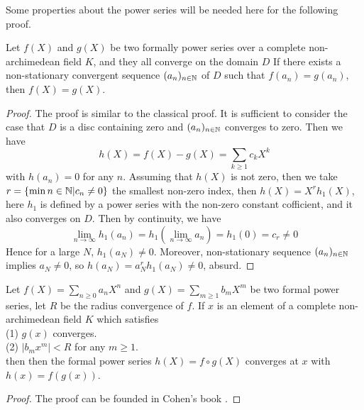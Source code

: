 Some properties about the power series will be needed here for the following proof.
\begin{lemma} \label{cont}
    Let \(f(X)\) and \(g(X)\) be two formally power series over a complete non-archimedean field \(K\), and they all converge on the domain \(D\) If there exists a non-stationary convergent sequence \((a_n)_{n \in \mathbb{N}}\) of \(D\) such that \(f(a_n)=g(a_n)\), then \(f(X) = g(X)\).

    \begin{proof}
        The proof is similar to the classical proof. It is sufficient to consider the case that \(D\) is a disc containing zero and \((a_n)_{n \in \mathbb{N}}\) converges to zero. Then we have 
        \[h(X) = f(X)-g(X) = \sum_{k\geq 1} c_k X^k\]
        with \(h(a_n) = 0\) for any \(n\). Assuming that \(h(X)\) is not zero, then we take \(r = \{\min{n \in \mathbb{N}| c_n \neq 0}\}\) the smallest non-zero index, then \(h(X)=X^rh_1(X)\), here \(h_1\) is defined by a power series with the non-zero constant cofficient, and it also converges on \(D\). Then by continuity, we have
        \[ \lim_{n \rightarrow \infty} h_1(a_n) = h_1(\lim_{n \rightarrow \infty}a_n) = h_1(0) = c_r \neq 0\]
        Hence for a large \(N\), \(h_1(a_N) \neq 0\). Moreover, non-stationary sequence \((a_n)_{n\in \mathbb{N}}\) implies \(a_N \neq 0\), so \(h(a_N) = a_N^rh_1(a_N)\neq 0\), absurd.
    \end{proof}

    \begin{lemma}[composition] \label{composition}
        Let \(f(X) = \sum_{n \geq 0} a_nX^n\) and \(g(X) = \sum_{m\geq 1}b_mX^m\) be two formal power series, let \(R\) be the radius convergence of \(f\). If \(x\) is an element of a complete non-archimedean field \(K\) which satisfies\\
        (1) \(g(x)\) converges. \\
        (2) \(|b_mx^m| < R\) for any \(m \geq 1\). \\
        then then the formal power series \(h(X) = f\circ g (X)\) converges at \(x\) with \(h(x)=f(g(x))\).

        \begin{proof}
            The proof can be founded in Cohen's book \cite[Chapter 4, proposition 4.2.7]{cohen2007number}.
        \end{proof}
    \end{lemma}
\end{lemma}

